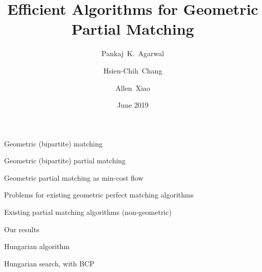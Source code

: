\documentclass[xcolor={dvipsnames,usenames}]{beamer}
\title{Efficient Algorithms for Geometric Partial Matching}
\author[Allen Xiao]
{
	Pankaj~K.~Agarwal \and
	Hsien-Chih~Chang \and
	Allen~Xiao
}
\institute[SoCG 2019]
{
	Department of Computer Science, Duke University
}
\date{June 2019}
\begin{document}
\begin{frame}
\maketitle
\end{frame}


\begin{frame}{Geometric (bipartite) matching}
\end{frame}

\begin{frame}{Geometric (bipartite) partial matching}
\end{frame}

\begin{frame}{Geometric partial matching as min-cost flow}
\end{frame}

\begin{frame}{Problems for existing geometric perfect matching algorithms}
\end{frame}

\begin{frame}{Existing partial matching algorithms (non-geometric)}


\end{frame}

\begin{frame}{Our results}
\end{frame}


\begin{frame}{Hungarian algorithm}
\end{frame}

\begin{frame}{Hungarian search, with BCP}
\end{frame}
\end{document}
